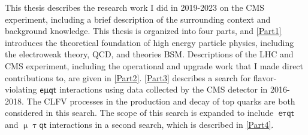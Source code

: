 This thesis describes the research work I did in 2019-2023 on the \ac{CMS} experiment, including a brief description of the surrounding context and background knowledge. This thesis is organized into four parts, and \autoref{Part1} introduces the theoretical foundation of high energy particle physics, including the electroweak theory, \ac{QCD}, and theories \ac{BSM}. Descriptions of the \ac{LHC} and {CMS} experiment, including the operational and upgrade work that I made direct contributions to, are given in \autoref{Part2}. \autoref{Part3} describes a search for flavor-violating $\textsf{e}\upmu\textsf{{q}t}$ interactions using data collected by the \ac{CMS} detector in 2016-2018. The \ac{CLFV} processes in the production and decay of top quarks are both considered in this search. The scope of this search is expanded to include $\textsf{e}\uptau\textsf{qt}$ and $\upmu\uptau\textsf{qt}$ interactions in a second search, which is described in \autoref{Part4}.




